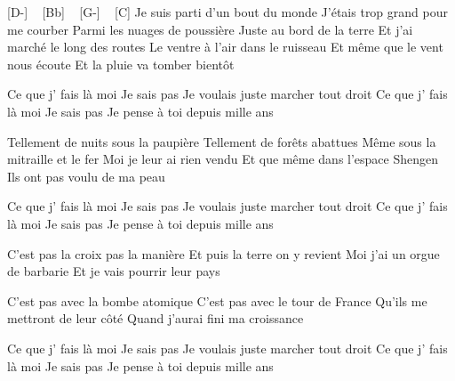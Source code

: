 [D-] ~ [Bb] ~ [G-]  ~ [C]
Je suis parti d'un bout du monde
J'étais trop grand pour me courber
Parmi les nuages de poussière
Juste au bord de la terre
Et j'ai marché le long des routes
Le ventre à l'air dans le ruisseau
Et même que le vent nous écoute
Et la pluie va tomber bientôt

Ce que j' fais là moi
Je sais pas
Je voulais juste marcher tout droit
Ce que j' fais là moi
Je sais pas
Je pense à toi depuis mille ans


Tellement de nuits sous la paupière
Tellement de forêts abattues
Même sous la mitraille et le fer
Moi je leur ai rien vendu
Et que même dans l'espace Shengen
Ils ont pas voulu de ma peau

Ce que j' fais là moi
Je sais pas
Je voulais juste marcher tout droit
Ce que j' fais là moi
Je sais pas
Je pense à toi depuis mille ans

C'est pas la croix pas la manière
Et puis la terre on y revient
Moi j'ai un orgue de barbarie
Et je vais pourrir leur pays

C'est pas avec la bombe atomique
C'est pas avec le tour de France
Qu'ils me mettront de leur côté
Quand j'aurai fini ma croissance

Ce que j' fais là moi
Je sais pas
Je voulais juste marcher tout droit
Ce que j' fais là moi
Je sais pas
Je pense à toi depuis mille ans